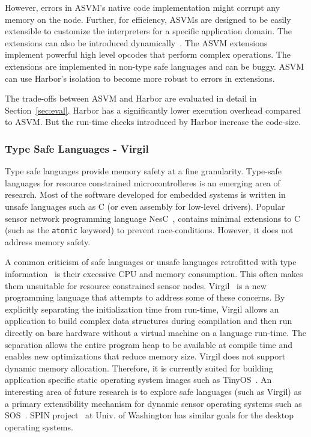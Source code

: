 However, errors in ASVM's native code implementation might corrupt any
memory on the node.
%
Further, for efficiency, ASVMs are designed to be easily extensible to
customize the interpreters for a specific application domain.
%
The extensions can also be introduced dynamically~\cite{balani06dvm}.
%
The ASVM extensions implement powerful high level opcodes that perform
complex operations.
%
The extensions are implemented in non-type safe languages and can be
buggy.
%
ASVM can use Harbor's isolation to become more robust to errors in
extensions.


The trade-offs between ASVM and Harbor are evaluated in detail in
Section~\ref{sec:eval}.
%
Harbor has a significantly lower execution overhead compared to ASVM.
%
But the run-time checks introduced by Harbor increase the code-size.
%
\subsubsection{Type Safe Languages - Virgil}
%
Type safe languages provide memory safety at a fine granularity.
%
Type-safe languages for resource constrained microcontrolleres is an
emerging area of research.
%
Most of the software developed for embedded systems is written in
unsafe languages such as C (or even assembly for low-level drivers). 
%
Popular sensor network programming language NesC~\cite{gay03nesc},
contains minimal extensions to C (such as the \texttt{atomic} keyword)
to prevent race-conditions.
%
However, it does not address memory safety.


A common criticism of safe languages or unsafe languages retrofitted
with type information~\cite{ccured02necula} is their excessive CPU and
memory consumption.
%
This often makes them unsuitable for resource constrained sensor
nodes.
%
Virgil~\cite{titzer06virgil} is a new programming language that
attempts to address some of these concerns.
%
By explicitly separating the initialization time from run-time, Virgil
allows an application to build complex data structures during
compilation and then run directly on bare hardware without a virtual
machine on a language run-time.
%
The separation allows the entire program heap to be available at
compile time and enables new optimizations that reduce memory size.
%
Virgil does not support dynamic memory allocation.
%
Therefore, it is currently suited for building application specific
static operating system images such as TinyOS~\cite{levis05t2}.
%
An interesting area of future research is to explore safe languages
(such as Virgil) as a primary extensibility mechanism for dynamic
sensor operating systems such as SOS~\cite{ram05sos}.
%
SPIN project~\cite{spin95sosp} at Univ. of Washington has similar
goals for the desktop operating systems.

